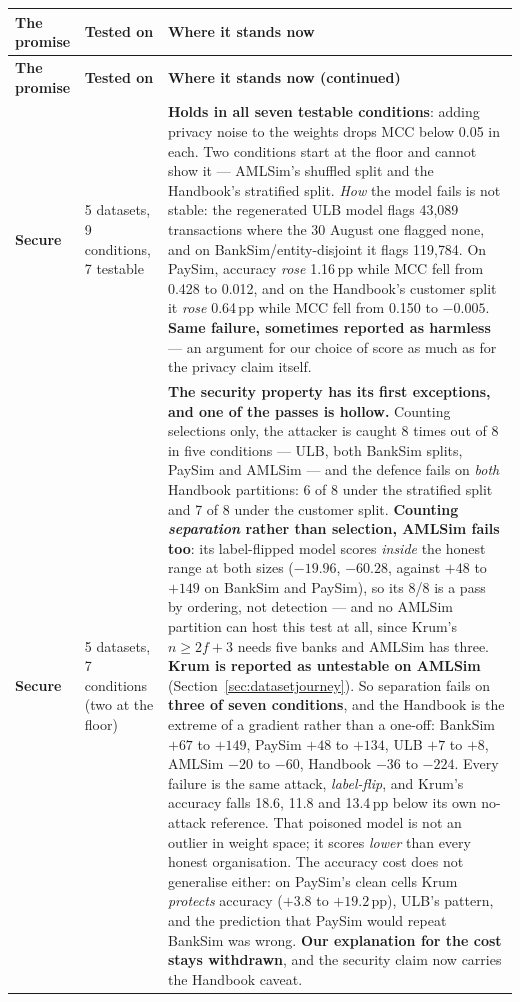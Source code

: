 \documentclass[11pt]{article}
\begin{document}
{\small
\renewcommand{\arraystretch}{1.2}
\begin{xltabular}{\linewidth}{@{}p{3.1cm} p{2.6cm} X@{}}
\toprule
\textbf{The promise} & \textbf{Tested on} & \textbf{Where it stands now} \\
\midrule
\endfirsthead
\toprule
\textbf{The promise} & \textbf{Tested on} & \textbf{Where it stands now (continued)} \\
\midrule
\endhead
\textbf{Secure}  & 5 datasets, 9 conditions, 7 testable & \textbf{Holds in all seven testable conditions}: adding privacy noise to the weights drops MCC below 0.05 in each. Two conditions start at the floor and cannot show it --- AMLSim's shuffled split and the Handbook's stratified split. \emph{How} the model fails is not stable: the regenerated ULB model flags 43{,}089 transactions where the 30 August one flagged none, and on BankSim/entity-disjoint it flags 119{,}784. On PaySim, accuracy \emph{rose} 1.16\,pp while MCC fell from 0.428 to 0.012, and on the Handbook's customer split it \emph{rose} 0.64\,pp while MCC fell from 0.150 to $-0.005$. \textbf{Same failure, sometimes reported as harmless} --- an argument for our choice of score as much as for the privacy claim itself. \\
\textbf{Secure}  & 5 datasets, 7 conditions (two at the floor) & \textbf{The security property has its first exceptions, and one of the passes is hollow.} Counting selections only, the attacker is caught 8 times out of 8 in five conditions --- ULB, both BankSim splits, PaySim and AMLSim --- and the defence fails on \emph{both} Handbook partitions: 6 of 8 under the stratified split and 7 of 8 under the customer split. \textbf{Counting \emph{separation} rather than selection, AMLSim fails too}: its label-flipped model scores \emph{inside} the honest range at both sizes ($-19.96$, $-60.28$, against $+48$ to $+149$ on BankSim and PaySim), so its 8/8 is a pass by ordering, not detection --- and no AMLSim partition can host this test at all, since Krum's $n \ge 2f+3$ needs five banks and AMLSim has three. \textbf{Krum is reported as untestable on AMLSim} (Section~\ref{sec:datasetjourney}). So separation fails on \textbf{three of seven conditions}, and the Handbook is the extreme of a gradient rather than a one-off: BankSim $+67$ to $+149$, PaySim $+48$ to $+134$, ULB $+7$ to $+8$, AMLSim $-20$ to $-60$, Handbook $-36$ to $-224$. Every failure is the same attack, \emph{label-flip}, and Krum's accuracy falls 18.6, 11.8 and 13.4\,pp below its own no-attack reference. That poisoned model is not an outlier in weight space; it scores \emph{lower} than every honest organisation. The accuracy cost does not generalise either: on PaySim's clean cells Krum \emph{protects} accuracy ($+3.8$ to $+19.2$\,pp), ULB's pattern, and the prediction that PaySim would repeat BankSim was wrong. \textbf{Our explanation for the cost stays withdrawn}, and the security claim now carries the Handbook caveat. \\

\end{xltabular}}
\end{document}
